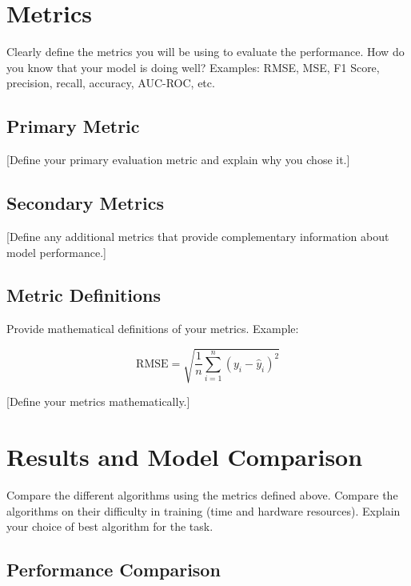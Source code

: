 \documentclass[aps,prl,preprint,groupedaddress]{revtex4-2}
\begin{document}
\section{Metrics}
\label{sec:metrics}

Clearly define the metrics you will be using to evaluate the performance. How do you know that your model is doing well? Examples: RMSE, MSE, F1 Score, precision, recall, accuracy, AUC-ROC, etc.

\subsection{Primary Metric}
[Define your primary evaluation metric and explain why you chose it.]

\subsection{Secondary Metrics}
[Define any additional metrics that provide complementary information about model performance.]

\subsection{Metric Definitions}
Provide mathematical definitions of your metrics. Example:

\begin{equation}
\text{RMSE} = \sqrt{\frac{1}{n}\sum_{i=1}^{n}(y_i - \hat{y}_i)^2}
\end{equation}

[Define your metrics mathematically.]

\section{Results and Model Comparison}
\label{sec:results}

Compare the different algorithms using the metrics defined above. Compare the algorithms on their difficulty in training (time and hardware resources). Explain your choice of best algorithm for the task.

\subsection{Performance Comparison}
\end{document}

